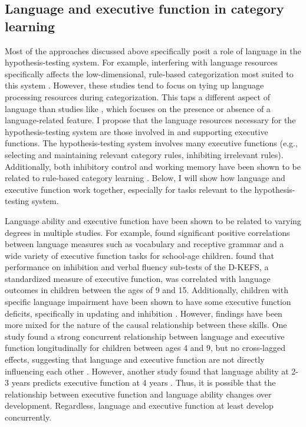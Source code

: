 \documentclass[../dissertation.tex]{subfiles}
\begin{document}
\subsection{Language and executive function in category learning}
Most of the approaches discussed above specifically posit a role of language in the hypothesis-testing system. For example, interfering with language resources specifically affects the low-dimensional, rule-based categorization most suited to this system \citep{Lupyan2009,Minda2008}. However, these studies tend to focus on tying up language processing resources during categorization. This taps a different aspect of language than studies like \citet{Lupyan2007}, which focuses on the presence or absence of a language-related feature. I propose that the language resources necessary for the hypothesis-testing system are those involved in and supporting executive functions. The hypothesis-testing system involves many executive functions (e.g., selecting and maintaining relevant category rules, inhibiting irrelevant rules). Additionally, both inhibitory control and working memory have been shown to be related to rule-based category learning \citep{Rabi2014}. Below, I will show how language and executive function work together, especially for tasks relevant to the hypothesis-testing system. \par
	Language ability and executive function have been shown to be related to varying degrees in multiple studies. For example, \citet{Figueras2008} found significant positive correlations between language measures such as vocabulary and receptive grammar and a wide variety of executive function tasks for school-age children. \citet{Berninger2017} found that performance on inhibition and verbal fluency sub-tests of the D-KEFS, a standardized measure of executive function, was correlated with language outcomes in children between the ages of 9 and 15. Additionally, children with specific language impairment have been shown to have some executive function deficits, specifically in updating and inhibition \citep{Im-Bolter2006}. However, findings have been more mixed for the nature of the causal relationship between these skills. One study found a strong concurrent relationship between language and executive function longitudinally for children between ages 4 and 9, but no cross-lagged effects, suggesting that language and executive function are not directly influencing each other \citep{Gooch2016}. However, another study found that language ability at 2-3 years predicts executive function at 4 years \citep{Kuhn2014}. Thus, it is possible that the relationship between executive function and language ability changes over development. Regardless, language and executive function at least develop concurrently. \par
\end{document}
